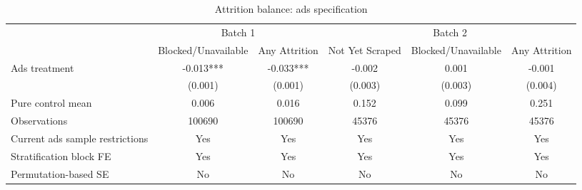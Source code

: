 \begin{table}[!htbp]
    \centering
    \caption{Attrition balance: ads specification}
    \label{tab:attrition_ads}
    \scriptsize
    \begin{adjustbox}{width=\textwidth}
    \begin{tabular}{lccccc}
    \toprule
     & \multicolumn{2}{c}{Batch 1} & \multicolumn{3}{c}{Batch 2} \\
    \cmidrule(lr){2-3} \cmidrule(lr){4-6}
     & Blocked/Unavailable & Any Attrition & Not Yet Scraped & Blocked/Unavailable & Any Attrition \\
    \midrule
    Ads treatment & -0.013*** & -0.033*** & -0.002 & 0.001 & -0.001 \\
     & (0.001) & (0.001) & (0.003) & (0.003) & (0.004) \\
    Pure control mean & 0.006 & 0.016 & 0.152 & 0.099 & 0.251 \\
    Observations & 100690 & 100690 & 45376 & 45376 & 45376 \\
    Current ads sample restrictions & Yes & Yes & Yes & Yes & Yes \\
    Stratification block FE & Yes & Yes & Yes & Yes & Yes \\
    Permutation-based SE & No & No & No & No & No \\
    \bottomrule
    \end{tabular}
    \end{adjustbox}
\end{table}
